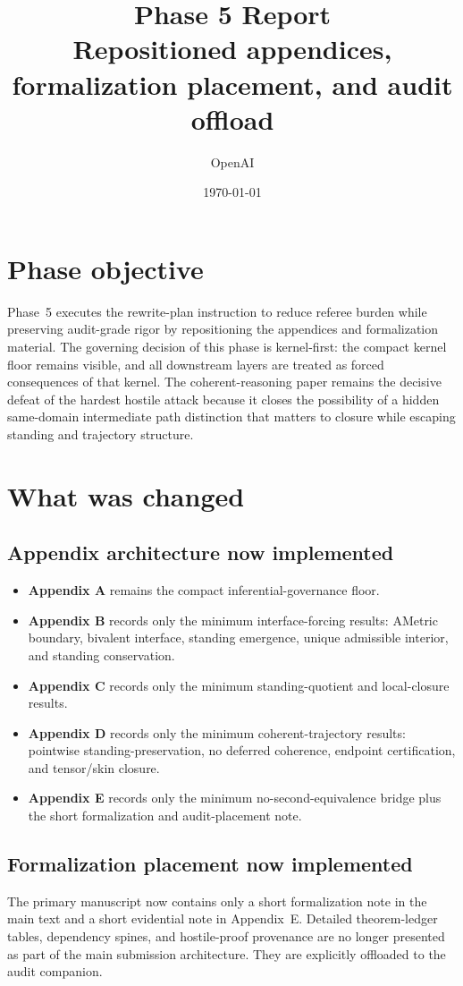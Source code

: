 \documentclass[11pt]{article}
\title{Phase 5 Report\\\large Repositioned appendices, formalization placement, and audit offload}
\author{OpenAI}
\date{\today}
\begin{document}
\maketitle

\section{Phase objective}
Phase~5 executes the rewrite-plan instruction to reduce referee burden while preserving audit-grade rigor by repositioning the appendices and formalization material. The governing decision of this phase is kernel-first: the compact kernel floor remains visible, and all downstream layers are treated as forced consequences of that kernel. The coherent-reasoning paper remains the decisive defeat of the hardest hostile attack because it closes the possibility of a hidden same-domain intermediate path distinction that matters to closure while escaping standing and trajectory structure.

\section{What was changed}
\subsection*{Appendix architecture now implemented}
\begin{itemize}
  \item \textbf{Appendix A} remains the compact inferential-governance floor.
  \item \textbf{Appendix B} records only the minimum interface-forcing results: AMetric boundary, bivalent interface, standing emergence, unique admissible interior, and standing conservation.
  \item \textbf{Appendix C} records only the minimum standing-quotient and local-closure results.
  \item \textbf{Appendix D} records only the minimum coherent-trajectory results: pointwise standing-preservation, no deferred coherence, endpoint certification, and tensor/skin closure.
  \item \textbf{Appendix E} records only the minimum no-second-equivalence bridge plus the short formalization and audit-placement note.
\end{itemize}

\subsection*{Formalization placement now implemented}
The primary manuscript now contains only a short formalization note in the main text and a short evidential note in Appendix~E. Detailed theorem-ledger tables, dependency spines, and hostile-proof provenance are no longer presented as part of the main submission architecture. They are explicitly offloaded to the audit companion.
\end{document}
